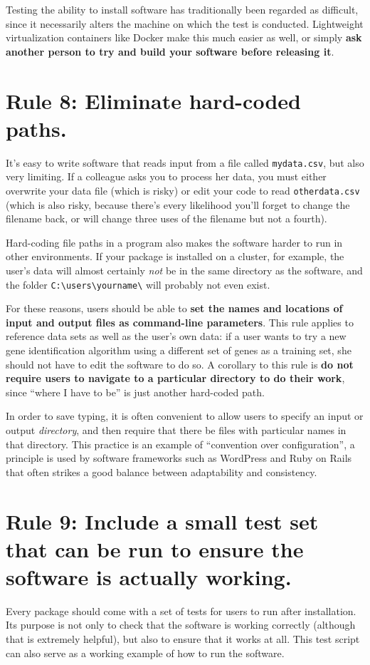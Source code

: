 \documentclass[10pt,letterpaper]{article}
\newcommand{\rulemajor}[1]{\section*{#1}}
\newcommand{\ruleminor}[1]{\textbf{#1}}
\begin{document}
Testing the ability to install software has traditionally been
regarded as difficult, since it necessarily alters the machine on
which the test is conducted.  Lightweight virtualization containers
like Docker make this much easier as well, or simply \ruleminor{ask
another person to try and build your software before releasing it}.

\rulemajor{Rule 8: Eliminate hard-coded paths.}

It's easy to write software that reads input from a file called
\texttt{mydata.csv}, but also very limiting. If a colleague asks you
to process her data, you must either overwrite your data file (which
is risky) or edit your code to read \texttt{otherdata.csv} (which is
also risky, because there's every likelihood you'll forget to change
the filename back, or will change three uses of the filename but not a
fourth).

Hard-coding file paths in a program also makes the software harder to
run in other environments. If your package is installed on a cluster,
for example, the user's data will almost certainly \emph{not} be in
the same directory as the software, and the folder
\texttt{C:\textbackslash{}users\textbackslash{}yourname\textbackslash{}}
will probably not even exist.

For these reasons, users should be able to \ruleminor{set the names
and locations of input and output files as command-line parameters}.
This rule applies to reference data sets as well as the user's own
data: if a user wants to try a new gene identification algorithm using
a different set of genes as a training set, she should not have to
edit the software to do so.  A corollary to this rule is \ruleminor{do
not require users to navigate to a particular directory to do their
work}, since ``where I have to be'' is just another hard-coded path.

In order to save typing, it is often convenient to allow users to
specify an input or output \emph{directory}, and then require that
there be files with particular names in that directory. This practice
is an example of ``convention over configuration'', a principle is
used by software frameworks such as WordPress and Ruby on Rails that
often strikes a good balance between adaptability and consistency.

\rulemajor{Rule 9: Include a small test set that can be run to ensure the software is actually working.}

Every package should come with a set of tests for users to run after
installation. Its purpose is not only to check that the software is
working correctly (although that is extremely helpful), but also to
ensure that it works at all. This test script can also serve as a
working example of how to run the software.
\end{document}
